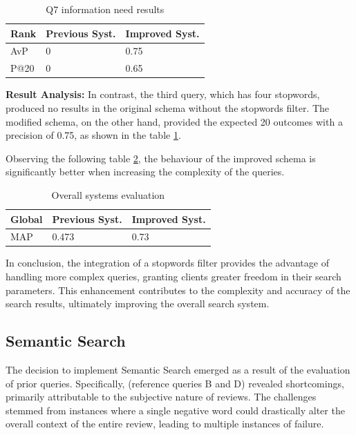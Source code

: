 \documentclass[sigconf]{acmart}
\begin{document}
\begin{table}[H]
\caption{Q7 information need results}
\label{tab:q7}
\begin{tabular}{lll}
\toprule
Rank & Previous Syst. & Improved Syst.\\
\midrule
AvP & 0 & 0.75  \\
P@20 & 0 & 0.65 \\
\bottomrule
\end{tabular}
\end{table}

\textbf{Result Analysis:} In contrast, the third query, which has four stopwords, produced no results in the original schema without the stopwords filter. The modified schema, on the other hand, provided the expected 20 outcomes with a precision of 0.75, as shown in the table \ref{tab:q7}.

Observing the following table \ref{tab:map_stopwords}, the behaviour of the improved schema is significantly better when increasing the complexity of the queries.

\begin{table}[H]
\caption{Overall systems evaluation}
\label{tab:map_stopwords}
\begin{tabular}{lll}
\toprule
Global & Previous Syst. & Improved Syst.\\
\midrule
MAP & 0.473 & 0.73  \\

\bottomrule
\end{tabular}
\end{table}

In conclusion, the integration of a stopwords filter provides the advantage of handling more complex queries, granting clients greater freedom in their search parameters. This enhancement contributes to the complexity and accuracy of the search results, ultimately improving the overall search system.


\renewcommand{\thesubsection}{\arabic{section}.2}
\subsection{Semantic Search}

The decision to implement Semantic Search emerged as a result of the evaluation of prior queries. Specifically, (reference queries B and D) revealed shortcomings, primarily attributable to the subjective nature of reviews. The challenges stemmed from instances where a single negative word could drastically alter the overall context of the entire review, leading to multiple instances of failure.
\end{document}
